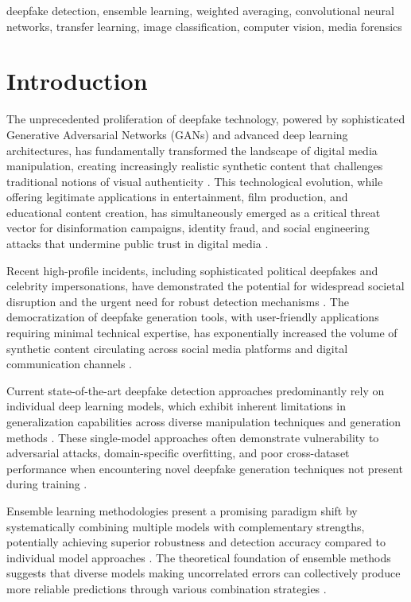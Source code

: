 \documentclass[conference]{IEEEtran}
\begin{document}
\begin{IEEEkeywords}
deepfake detection, ensemble learning, weighted averaging, convolutional neural networks, transfer learning, image classification, computer vision, media forensics
\end{IEEEkeywords}

\section{Introduction}

The unprecedented proliferation of deepfake technology, powered by sophisticated Generative Adversarial Networks (GANs) and advanced deep learning architectures, has fundamentally transformed the landscape of digital media manipulation, creating increasingly realistic synthetic content that challenges traditional notions of visual authenticity \cite{goodfellow2014generative}. This technological evolution, while offering legitimate applications in entertainment, film production, and educational content creation, has simultaneously emerged as a critical threat vector for disinformation campaigns, identity fraud, and social engineering attacks that undermine public trust in digital media \cite{ajder2019deepfakes}.

Recent high-profile incidents, including sophisticated political deepfakes and celebrity impersonations, have demonstrated the potential for widespread societal disruption and the urgent need for robust detection mechanisms \cite{verdoliva2020media}. The democratization of deepfake generation tools, with user-friendly applications requiring minimal technical expertise, has exponentially increased the volume of synthetic content circulating across social media platforms and digital communication channels \cite{tolosana2020faceforensics}.

Current state-of-the-art deepfake detection approaches predominantly rely on individual deep learning models, which exhibit inherent limitations in generalization capabilities across diverse manipulation techniques and generation methods \cite{wang2020cnn}. These single-model approaches often demonstrate vulnerability to adversarial attacks, domain-specific overfitting, and poor cross-dataset performance when encountering novel deepfake generation techniques not present during training \cite{li2020celeb}.

Ensemble learning methodologies present a promising paradigm shift by systematically combining multiple models with complementary strengths, potentially achieving superior robustness and detection accuracy compared to individual model approaches \cite{dietterich2000ensemble}. The theoretical foundation of ensemble methods suggests that diverse models making uncorrelated errors can collectively produce more reliable predictions through various combination strategies \cite{breiman2001random}.
\end{document}
